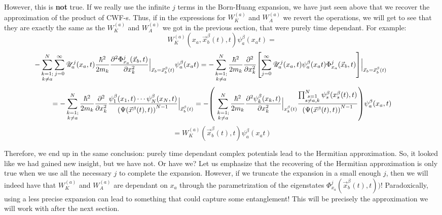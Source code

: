 \documentclass[11pt, a4paper]{article} %
\newcommand{\s}{\mathbb{S}}
\newcommand{\U}{\mathscr{U}}
\begin{document}
However, this is {\bf not} true. If we really use the infinite $j$ terms in the Born-Huang expansion, we have just seen above that we recover the approximation of the product of CWF-s. Thus, if in the expressions for $W^{(a)}_K$ and $W^{(a)}_A$ we revert the operations, we will get to see that they are exactly the same as the $W^{(a)}_K$ and $W^{(a)}_A$ we got in the previous section, that were purely time dependant. For example:
$$
W_K^{(a)}(x_a, \vec{x}_b^\beta (t),t)\psi_a^\beta(x_a t)=
$$
$$
\hspace{-1.1cm}- \sum_{\substack{k=1; \\ k\neq a}}^{N} \sum_{j=0}^\infty \U^j_a(x_a,t) \frac{\hbar^2}{2m_k} \pdv[2]{ \Phi_{x_a}^j(\vec{x}_b,t)}{x_k}\Big\rvert_{\vec{x}_b=\vec{x}_b^\beta(t)} \psi_a^\beta(x_a t)=- \sum_{\substack{k=1; \\ k\neq a}}^{N}  \frac{\hbar^2}{2m_k} \pdv[2]{}{x_k}\qty[\sum_{j=0}^\infty  \U^j_a(x_a,t)\psi_a^\beta(x_a t) \Phi_{x_a}^j(\vec{x}_b,t)]\Big\rvert_{\vec{x}_b=\vec{x}_b^\beta(t)}
$$
$$
=- \sum_{\substack{k=1; \\ k\neq a}}^{N}  \frac{\hbar^2}{2m_k} \pdv[2]{}{x_k} \frac{\psi^\beta_1(x_1,t)\cdots \psi^\beta_N(x_N,t)}{\qty(\Psi(\vec{x}^\beta(t),t))^{N-1}} \Big\rvert_{\vec{x}_b^\beta(t)}=- \qty(\ \sum_{\substack{k=1; \\ k\neq a}}^{N} \frac{\hbar^2}{2m_k}\pdv[2]{\psi_k^\beta(x_k,t)}{x_k}\Big\rvert_{x_k^\beta(t)}\frac{\prod_{\substack{s=1\\s\neq a,k}}^{N} \psi_s^\beta(x_s^\beta(t),t) }{\qty(\Psi(\vec{x}^\beta(t),t))^{N-1}} )\psi_a^\beta(x_a,t) 
$$
$$
=W_K^{(a)}(\vec{x}_b^\beta (t),t)\psi_a^\beta(x_a t)
$$

Therefore, we end up in the same  conclusion: purely time dependant complex potentials lead to the Hermitian approximation. So, it looked like we had gained new insight, but we have not. Or have we? Let us emphasize that the recovering of the Hermitian approximation is only true when we use all the necessary $j$ to complete the expansion. However, if we truncate the expansion in a small enough $j$, then we will indeed have that $W^{(a)}_K$ and $W^{(a)}_A$ are dependant on $x_a$ through the parametrization of the eigenstates $\Phi_{x_a}^j(\vec{x}_b^\beta(t),t))$! Paradoxically, using a less precise expansion can lead to something that could capture some entanglement! This will be precisely the approximation we will work with after the next section.
\end{document}
